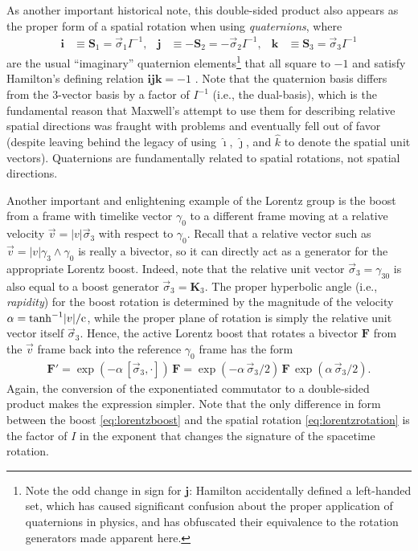 \documentclass[1p,sort&compress]{elsarticle}
\numberwithin{equation}{section}
\newcommand{\rv}[1]{\vec{#1}}
\newcommand{\bv}[1]{\mathbf{#1}}
\newcommand{\cc}{{\rm c}}
\begin{document}
As another important historical note, this double-sided product also appears as the proper form of a spatial rotation when using \emph{quaternions}, where 
\begin{align}
  \bv{i} &\equiv \bv{S}_1 = \rv{\sigma}_1I^{-1}, &
  \bv{j} &\equiv -\bv{S}_2 = -\rv{\sigma}_2I^{-1}, &
  \bv{k} &\equiv \bv{S}_3 = \rv{\sigma}_3I^{-1} 
\end{align}
are the usual ``imaginary'' quaternion elements\footnote{Note the odd change in sign for $\bv{j}$: Hamilton accidentally defined a left-handed set, which has caused significant confusion about the proper application of quaternions in physics, and has obfuscated their equivalence to the rotation generators made apparent here.} that all square to $-1$ and satisfy Hamilton's defining relation $\bv{i}\bv{j}\bv{k} = -1$ \cite{Hamilton1853,Hamilton1901}.  Note that the quaternion basis differs from the 3-vector basis by a factor of $I^{-1}$ (i.e., the dual-basis), which is the fundamental reason that Maxwell's attempt to use them for describing relative spatial directions \cite{Maxwell1881} was fraught with problems and eventually fell out of favor (despite leaving behind the legacy of using $\hat{\imath}$, $\hat{\jmath}$, and $\hat{k}$ to denote the spatial unit vectors).  Quaternions are fundamentally related to spatial rotations, not spatial directions.

Another important and enlightening example of the Lorentz group is the boost from a frame with timelike vector $\gamma_0$ to a different frame moving at a relative velocity $\rv{v} = |v| \rv{\sigma}_3$ with respect to $\gamma_0$.  Recall that a relative vector such as $\rv{v} = |v| \gamma_3\wedge\gamma_0$ is really a bivector, so it can directly act as a generator for the appropriate Lorentz boost.  Indeed, note that the relative unit vector $\rv{\sigma}_3 = \gamma_{30}$ is also equal to a boost generator $\rv{\sigma}_3 = \bv{K}_3$.  The proper hyperbolic angle (i.e., \emph{rapidity}) for the boost rotation is determined by the magnitude of the velocity $\alpha = \tanh^{-1}\!|v|/\cc$, while the proper plane of rotation is simply the relative unit vector itself $\rv{\sigma}_3$.  Hence, the active Lorentz boost that rotates a bivector $\bv{F}$ from the $\rv{v}$ frame back into the reference $\gamma_0$ frame has the form
\begin{align}\label{eq:lorentzboost}
  \bv{F}' = \exp(-\alpha\,[\rv{\sigma}_3,\cdot])\,\bv{F} = \exp(-\alpha\,\rv{\sigma}_3/2)\,\bv{F}\,\exp(\alpha\,\rv{\sigma}_3/2).
\end{align}
Again, the conversion of the exponentiated commutator to a double-sided product makes the expression simpler.  Note that the only difference in form between the boost \eqref{eq:lorentzboost} and the spatial rotation \eqref{eq:lorentzrotation} is the factor of $I$ in the exponent that changes the signature of the spacetime rotation.
\end{document}

